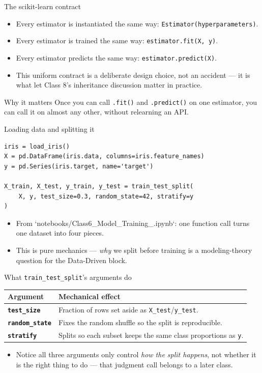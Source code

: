 \begin{frame}{The scikit-learn contract}
\begin{itemize}
\item Every estimator is instantiated the same way: \texttt{Estimator(hyperparameters)}.
\item Every estimator is trained the same way: \texttt{estimator.fit(X, y)}.
\item Every estimator predicts the same way: \texttt{estimator.predict(X)}.
\item This uniform contract is a deliberate design choice, not an accident --- it is what let Class 8's inheritance discussion matter in practice.
\end{itemize}
\begin{block}{Why it matters}
Once you can call \texttt{.fit()} and \texttt{.predict()} on one estimator, you can call it on almost any other, without relearning an API.
\end{block}
\coursefooter
\end{frame}

\begin{frame}[fragile]{Loading data and splitting it}
\begin{lstlisting}[style=coursepython]
iris = load_iris()
X = pd.DataFrame(iris.data, columns=iris.feature_names)
y = pd.Series(iris.target, name='target')

X_train, X_test, y_train, y_test = train_test_split(
    X, y, test_size=0.3, random_state=42, stratify=y
)
\end{lstlisting}
\begin{itemize}
\item From `notebooks/Class6\_Model\_Training\_.ipynb`: one function call turns one dataset into four pieces.
\item This is pure mechanics --- \emph{why} we split before training is a modeling-theory question for the Data-Driven block.
\end{itemize}
\coursefooter
\end{frame}

\begin{frame}{What \texttt{train\_test\_split}'s arguments do}
\begin{tabularx}{\textwidth}{>{\bfseries}l X}
Argument & Mechanical effect \\
\toprule
\texttt{test\_size} & Fraction of rows set aside as \texttt{X\_test}/\texttt{y\_test}. \\
\texttt{random\_state} & Fixes the random shuffle so the split is reproducible. \\
\texttt{stratify} & Splits so each subset keeps the same class proportions as \texttt{y}. \\
\bottomrule
\end{tabularx}
\vspace{0.4em}
\begin{itemize}
\item Notice all three arguments only control \emph{how the split happens}, not whether it is the right thing to do --- that judgment call belongs to a later class.
\end{itemize}
\coursefooter
\end{frame}

